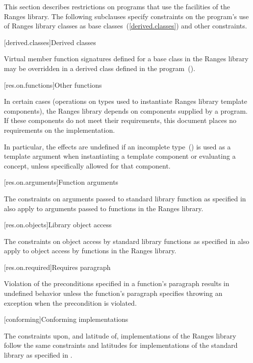 \pnum
This section describes restrictions on \Cpp programs that use the facilities of
the Ranges library. The following subclauses specify constraints on the
program's use of Ranges library classes as base classes~(\ref{derived.classes})
and other constraints.

[derived.classes]{Derived classes}

\pnum
Virtual member function signatures defined
%
for a base class in the Ranges
%
%
library may be overridden in a derived class defined in the
program~().

[res.on.functions]{Other functions}

\pnum
In certain cases (operations on types used to instantiate Ranges library
template components), the Ranges library depends on components supplied by a
\Cpp program. If these components do not meet their requirements, this document
places no requirements on the implementation.

\pnum
In particular, the effects are undefined if an incomplete
type~() is used as a template argument when instantiating a
template component or evaluating a concept, unless specifically allowed for that
component.

[res.on.arguments]{Function arguments}

\pnum
{}%
%
The constraints on arguments passed to \Cpp standard library function as
specified in  also apply to arguments passed to
functions in the Ranges library.

[res.on.objects]{Library object access}

\pnum
The constraints on object access by \Cpp standard library functions as specified
in  also apply to object access by functions in the
Ranges library.

[res.on.required]{Requires paragraph}

\pnum
{}%
Violation of the preconditions specified in a function's \requires paragraph
results in undefined behavior unless the function's \throws paragraph specifies
throwing an exception when the precondition is violated.

[conforming]{Conforming implementations}

\pnum
The constraints upon, and latitude of, implementations of the Ranges library
follow the same constraints and latitudes for implementations of the \Cpp
standard library as specified in .
